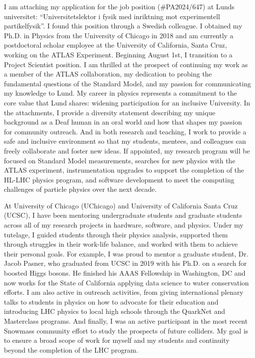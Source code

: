
I am attaching my application for the job position (\#PA2024/647) at Lunds universitet: \enquote{Universitetslektor i fysik med inriktning mot experimentell partikelfysik}. I found this position through a Swedish colleague. I obtained my Ph.D. in Physics from the University of Chicago in 2018 and am currently a postdoctoral scholar employee at the University of California, Santa Cruz, working on the ATLAS Experiment. Beginning August 1st, I transition to a Project Scientist position. I am thrilled at the prospect of continuing my work as a member of the ATLAS collaboration, my dedication to probing the fundamental questions of the Standard Model, and my passion for communicating my knowledge to Lund. My career in physics represents a commitment to the core value that Lund shares: widening participation for an inclusive University. In the attachments, I provide a diversity statement describing my unique background as a Deaf human in an oral world and how that shapes my passion for community outreach. And in both research and teaching, I work to provide a safe and inclusive environment so that my students, mentees, and colleagues can freely collaborate and foster new ideas. If appointed, my research program will be focused on Standard Model measurements, searches for new physics with the ATLAS experiment, instrumentation upgrades to support the completion of the HL-LHC physics program, and software development to meet the computing challenges of particle physics over the next decade.

At University of Chicago (UChicago) and University of California Santa Cruz (UCSC), I have been mentoring undergraduate students and graduate students across all of my research projects in hardware, software, and physics. Under my tutelage, I guided students through their physics analysis, supported them through struggles in their work-life balance, and worked with them to achieve their personal goals. For example, I was proud to mentor a graduate student, Dr. Jacob Pasner, who graduated from UCSC in 2019 with his Ph.D. on a search for boosted Higgs bosons. He finished his AAAS Fellowship in Washington, DC and now works for the State of California applying data science to water conservation efforts. I am also active in outreach activities, from giving international plenary talks to students in physics on how to advocate for their education and introducing LHC physics to local high schools through the QuarkNet and Masterclass programs. And finally, I was an active participant in the most recent Snowmass community effort to study the prospects of future colliders. My goal is to ensure a broad scope of work for myself and my students and continuity beyond the completion of the LHC program.

